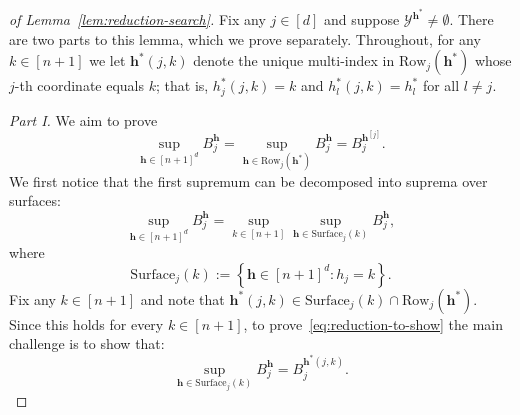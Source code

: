 \begin{proof}[of Lemma~\ref{lem:reduction-search}]
Fix any $j\in[d]$ and suppose $\mathcal{Y}^{\mathbf{h}^*}\neq\emptyset$. There are two parts to this lemma, which we prove separately.
Throughout, for any $k \in [n+1]$ we let $\mathbf{h}^*(j,k)$ denote the unique multi-index in $\mathrm{Row}_j(\mathbf{h}^*)$ whose $j$-th coordinate equals $k$; that is, $h^*_j(j,k) = k$ and $h^*_l(j,k) = h^*_l$ for all $l \neq j$.

\textit{Part I.} We aim to prove
\begin{equation}
\sup_{\mathbf{h}\in[n+1]^d}B^{\mathbf{h}}_j
=\sup_{\mathbf{h}\in\mathrm{Row}_j(\mathbf{h}^*)}B^{\mathbf{h}}_j
=B^{\mathbf{h}^{[j]}}_j.
\label{eq:reduction-to-show}
\end{equation}
We first notice that the first supremum can be decomposed into suprema over surfaces:
\[
\sup_{\mathbf{h} \in [n+1]^d}B^{\mathbf{h}}_j = \sup_{k \in [n+1]}\sup_{\mathbf{h} \in \mathrm{Surface}_j(k)}B^{\mathbf{h}}_j,
\]
where
\[
  \mathrm{Surface}_j(k) := \left\{\mathbf{h} \in [n+1]^d: h_j = k \right\}. 
\]
Fix any $k \in [n+1]$ and note that $\mathbf{h}^*(j,k) \in \mathrm{Surface}_j(k) \cap \mathrm{Row}_j(\mathbf{h}^*)$. Since this holds for every $k \in [n+1]$, to prove~\eqref{eq:reduction-to-show} the main challenge is to show that:
\begin{equation}
    \sup_{\mathbf{h} \in \mathrm{Surface}_j(k)}B^{\mathbf{h}}_j = B^{\mathbf{h}^*({j,k})}_j.
    \label{eq:surface}
\end{equation}


\end{proof}
